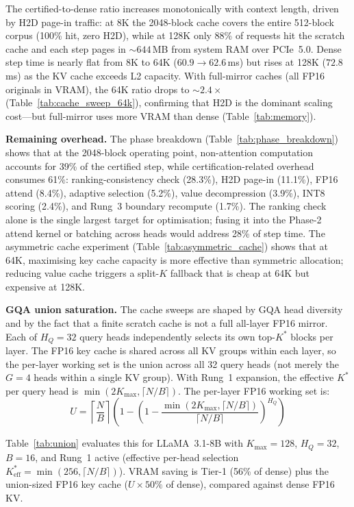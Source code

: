 \documentclass[10pt,twocolumn,a4paper]{article}
\theoremstyle{definition}
\theoremstyle{remark}
\begin{document}
The certified-to-dense ratio increases monotonically with context length, driven by H2D page-in traffic: at 8K the 2048-block cache covers the entire 512-block corpus (100\% hit, zero H2D), while at 128K only 88\% of requests hit the scratch cache and each step pages in ${\sim}644$\,MB from system RAM over PCIe~5.0.  Dense step time is nearly flat from 8K to 64K ($60.9 \to 62.6$\,ms) but rises at 128K ($72.8$\,ms) as the KV cache exceeds L2 capacity.  With full-mirror caches (all FP16 originals in VRAM), the 64K ratio drops to ${\sim}2.4\times$ (Table~\ref{tab:cache_sweep_64k}), confirming that H2D is the dominant scaling cost---but full-mirror uses more VRAM than dense (Table~\ref{tab:memory}).

\textbf{Remaining overhead.}  The phase breakdown (Table~\ref{tab:phase_breakdown}) shows that at the 2048-block operating point, non-attention computation accounts for 39\% of the certified step, while certification-related overhead consumes 61\%: ranking-consistency check (28.3\%), H2D page-in (11.1\%), FP16 attend (8.4\%), adaptive selection (5.2\%), value decompression (3.9\%), INT8 scoring (2.4\%), and Rung~3 boundary recompute (1.7\%).  The ranking check alone is the single largest target for optimisation; fusing it into the Phase-2 attend kernel or batching across heads would address 28\% of step time.  The asymmetric cache experiment (Table~\ref{tab:asymmetric_cache}) shows that at 64K, maximising key cache capacity is more effective than symmetric allocation; reducing value cache triggers a split-$K$ fallback that is cheap at 64K but expensive at 128K.

\textbf{GQA union saturation.}  The cache sweeps are shaped by GQA head diversity and by the fact that a finite scratch cache is not a full all-layer FP16 mirror.  Each of $H_Q{=}32$ query heads independently selects its own top-$K^*$ blocks per layer.  The FP16 key cache is shared across all KV groups within each layer, so the per-layer working set is the union across all 32 query heads (not merely the $G{=}4$ heads within a single KV group).  With Rung~1 expansion, the effective $K^*$ per query head is $\min(2K_{\max}, \lceil N/B \rceil)$.  The per-layer FP16 working set is:
\begin{equation}
\label{eq:union}
  U = \!\left\lceil \frac{N}{B} \right\rceil\!
  \left(1 - \!\left(1 - \frac{\min(2K_{\max}, \lceil N/B \rceil)}
  {\lceil N/B \rceil}\right)^{\!H_Q}\right)
\end{equation}

Table~\ref{tab:union} evaluates this for LLaMA~3.1-8B
with $K_{\max}{=}128$, $H_Q{=}32$, $B{=}16$,
and Rung~1 active
(effective per-head selection $K^*_{\mathrm{eff}} = \min(256,\allowbreak \lceil N/B \rceil)$).
VRAM saving is Tier-1 (56\% of dense) plus the
union-sized FP16 key cache ($U \times 50\%$ of dense),
compared against dense FP16 KV\@.
\end{document}
